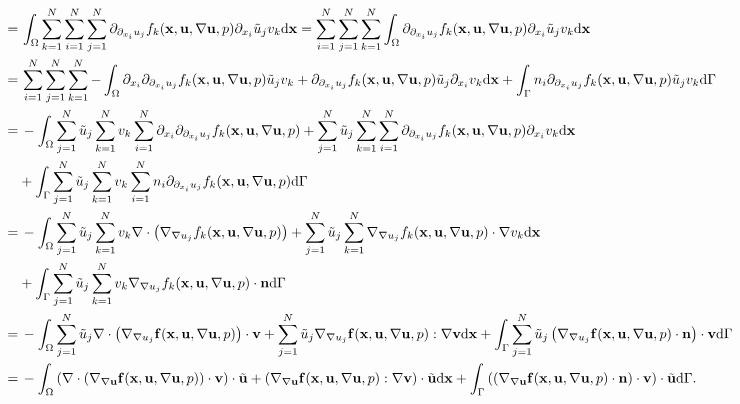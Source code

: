 \documentclass[oneside]{book}
\numberwithin{equation}{section}
\begin{document}
\begin{enumerate}[leftmargin=0in]
\begin{align*}
        =&\, \int_\Omega \sum_{k=1}^N\sum_{i=1}^N\sum_{j=1}^N \partial_{\partial_{x_i}u_j}f_k({\bf x},{\bf u},\nabla{\bf u},p)\partial_{x_i}\tilde{u}_jv_k{\rm d}{\bf x} = \sum_{i=1}^N\sum_{j=1}^N\sum_{k=1}^N \int_\Omega \partial_{\partial_{x_i}u_j}f_k({\bf x},{\bf u},\nabla{\bf u},p)\partial_{x_i}\tilde{u}_jv_k{\rm d}{\bf x}\\
        =&\, \sum_{i=1}^N\sum_{j=1}^N\sum_{k=1}^N -\int_\Omega \partial_{x_i}\partial_{\partial_{x_i}u_j}f_k({\bf x},{\bf u},\nabla{\bf u},p)\tilde{u}_jv_k + \partial_{\partial_{x_i}u_j}f_k({\bf x},{\bf u},\nabla{\bf u},p)\tilde{u}_j\partial_{x_i}v_k{\rm d}{\bf x} + \int_\Gamma n_i\partial_{\partial_{x_i}u_j}f_k({\bf x},{\bf u},\nabla{\bf u},p)\tilde{u}_jv_k{\rm d}\Gamma\\
        =&\, -\int_\Omega \sum_{j=1}^N \tilde{u}_j\sum_{k=1}^N v_k\sum_{i=1}^N \partial_{x_i}\partial_{\partial_{x_i}u_j}f_k({\bf x},{\bf u},\nabla{\bf u},p) + \sum_{j=1}^N \tilde{u}_j\sum_{k=1}^N\sum_{i=1}^N \partial_{\partial_{x_i}u_j}f_k({\bf x},{\bf u},\nabla{\bf u},p)\partial_{x_i}v_k{\rm d}{\bf x}\\
        &+ \int_\Gamma \sum_{j=1}^N \tilde{u}_j\sum_{k=1}^N v_k\sum_{i=1}^N n_i\partial_{\partial_{x_i}u_j}f_k({\bf x},{\bf u},\nabla{\bf u},p){\rm d}\Gamma\\
        =&\, - \int_\Omega \sum_{j=1}^N \tilde{u}_j\sum_{k=1}^N v_k\nabla\cdot\left(\nabla_{\nabla u_j}f_k({\bf x},{\bf u},\nabla{\bf u},p)\right) + \sum_{j=1}^N \tilde{u}_j\sum_{k=1}^N \nabla_{\nabla u_j}f_k({\bf x},{\bf u},\nabla{\bf u},p)\cdot\nabla v_k{\rm d}{\bf x}\\
        &+ \int_\Gamma \sum_{j=1}^N \tilde{u}_j\sum_{k=1}^N v_k\nabla_{\nabla u_j}f_k({\bf x},{\bf u},\nabla{\bf u},p)\cdot{\bf n}{\rm d}\Gamma\\
        =&\, -\int_\Omega \sum_{j=1}^N \tilde{u}_j\nabla\cdot\left(\nabla_{\nabla u_j}{\bf f}({\bf x},{\bf u},\nabla{\bf u},p)\right)\cdot{\bf v} + \sum_{j=1}^N \tilde{u}_j\nabla_{\nabla u_j}{\bf f}({\bf x},{\bf u},\nabla{\bf u},p):\nabla{\bf v}{\rm d}{\bf x} + \int_\Gamma \sum_{j=1}^N \tilde{u}_j\left(\nabla_{\nabla u_j}{\bf f}({\bf x},{\bf u},\nabla{\bf u},p)\cdot{\bf n}\right)\cdot{\bf v}{\rm d}\Gamma\\
        =&\, -\int_\Omega \left(\nabla\cdot\left(\nabla_{\nabla{\bf u}}{\bf f}({\bf x},{\bf u},\nabla{\bf u},p)\right)\cdot{\bf v}\right)\cdot\tilde{\bf u} + \left(\nabla_{\nabla{\bf u}}{\bf f}({\bf x},{\bf u},\nabla{\bf u},p):\nabla{\bf v}\right)\cdot\tilde{\bf u}{\rm d}{\bf x} + \int_\Gamma \left(\left(\nabla_{\nabla{\bf u}}{\bf f}({\bf x},{\bf u},\nabla{\bf u},p)\cdot{\bf n}\right)\cdot{\bf v}\right)\cdot\tilde{\bf u}{\rm d}\Gamma.

\end{align*}
\end{enumerate}
\end{document}
